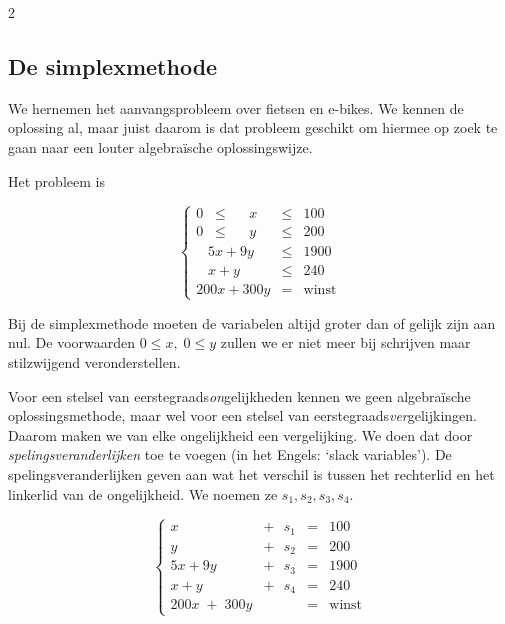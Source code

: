 \begin{multicols}{2}

\subsection{De simplexmethode}
	
	We hernemen het aanvangsprobleem over fietsen en e-bikes. We kennen de oplossing al, maar juist daarom is dat probleem geschikt om hiermee op zoek te gaan naar een louter algebraïsche oplossingswijze.
	
	Het probleem is
	
	$$
    \left\{
    \begin{array}{ccl}
    	
    	0\;\; \le \;\;\;\;\; x &\le &100 \\
    	0\;\;\le \;\;\;\;\; y &\le &200 \\
    	\;\;\;5x+9y &\le  &1900 \\
    	\;\;\;x+y &\le  &240\\
    	200x+300y &= &\mathrm{winst}
    	
    \end{array}
    \right.
    $$  

	
	Bij de simplexmethode moeten de variabelen altijd groter dan of gelijk zijn aan nul. De voorwaarden $0\le x, \;0\le y$ zullen we er niet meer bij schrijven maar stilzwijgend veronderstellen.
	
	Voor een stelsel van eerstegraads\emph{on}gelijkheden kennen we geen algebraïsche oplossingsmethode, maar wel voor een stelsel van eerstegraads\emph{ver}gelijkingen. Daarom maken we van elke ongelijkheid een vergelijking. We doen dat door \emph{spelingsveranderlijken} toe te voegen (in het Engels: `slack variables'). De spelingsveranderlijken geven aan wat het verschil is tussen het rechterlid en het linkerlid van de ongelijkheid. We noemen ze $s_1, s_2, s_3, s_4$.
	
	$$
	\left\{
	\begin{array}{rccl}
		
		 x & +\ \ \ s_1 &= &100 \\
    	 y & +\ \ \  s_2 &= &200 \\
    	5x+9y & +\ \ \  s_3&=  &1900 \\
    	x+y & +\ \ \  s_4 &=  &240\\
    	200x\;+\;300y & &= &\mathrm{winst}
		
	\end{array}
	\right.
	$$
	

\end{multicols}
